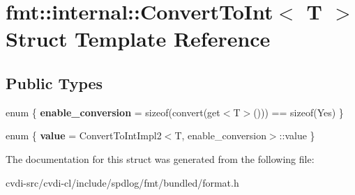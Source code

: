 \hypertarget{structfmt_1_1internal_1_1ConvertToInt}{}\section{fmt\+:\+:internal\+:\+:Convert\+To\+Int$<$ T $>$ Struct Template Reference}
\label{structfmt_1_1internal_1_1ConvertToInt}
\subsection*{Public Types}
\begin{DoxyCompactItemize}
\item 
enum \{ {\bfseries enable\+\_\+conversion} = sizeof(convert(get$<$T$>$())) == sizeof(Yes)
 \}\hypertarget{structfmt_1_1internal_1_1ConvertToInt_a124b09d02ab39c3606b3e7b827db88ee}{}\label{structfmt_1_1internal_1_1ConvertToInt_a124b09d02ab39c3606b3e7b827db88ee}

\item 
enum \{ {\bfseries value} = Convert\+To\+Int\+Impl2$<$T, enable\+\_\+conversion$>$\+:\+:value
 \}\hypertarget{structfmt_1_1internal_1_1ConvertToInt_a7ea9585492c5d353955a5783469e1f2e}{}\label{structfmt_1_1internal_1_1ConvertToInt_a7ea9585492c5d353955a5783469e1f2e}

\end{DoxyCompactItemize}


The documentation for this struct was generated from the following file\+:\begin{DoxyCompactItemize}
\item 
cvdi-\/src/cvdi-\/cl/include/spdlog/fmt/bundled/format.\+h\end{DoxyCompactItemize}
